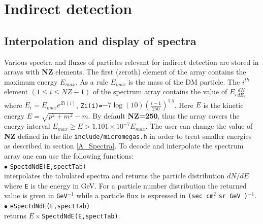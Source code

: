\documentclass[12pt,a4paper]{article}
\begin{document}
  
\section{Indirect detection}

\subsection{Interpolation and display of spectra}
Various spectra and fluxes  of particles  relevant for indirect detection are stored in
arrays with {\bf NZ} elements. 
The first (zeroth) element of the array contains the maximum energy $E_{max}$. As a rule   $E_{max}$ is the mass of the DM particle.    
The $i^{th}$ element  $(1\le i \leq NZ-1)$  of the spectrum array contains
the value of $E_i \frac{ dN}{dE_i} $ where  $E_i=E_{max} e^{Zi(i)}$,
\verb|Zi(i)=|$ -7 \log(10) \left(\frac{i-1}{250}\right)^{1.5}$.
Here $E$ is the kinetic energy $E=\sqrt{p^2+m^2}-m$.  By default  {\bf NZ=250}, thus the array  covers the  energy interval  
$E_{max} \ge E > 1.101 \times10^{-7}E_{max}$. The user can change the value of {\bf NZ} defined in the file {\tt include/micromegas.h} in order to  treat  smaller energies as described in
section \ref{A_Spectra}.
To decode and interpolate the spectrum array
one can use the following functions:\\

\noindent
$\bullet$  \verb|SpectdNdE(E,spectTab)|\\
interpolates the tabulated spectra  and returns the 
particle distribution $dN/dE$  where \verb|E| is the energy  in GeV. 
For a particle number  distribution the returned value is given in \verb|GeV|$^{-1}$
while  a particle flux is expressed in \verb|(sec cm|$^2$ \verb|sr GeV )|$^{-1}$.\\


 
\noindent
$\bullet$ \verb|eSpectdNdE(E,spectTab)|\\
 returns $E\times$\verb|SpectdNdE(E,spectTab)|.\\
\end{document}
